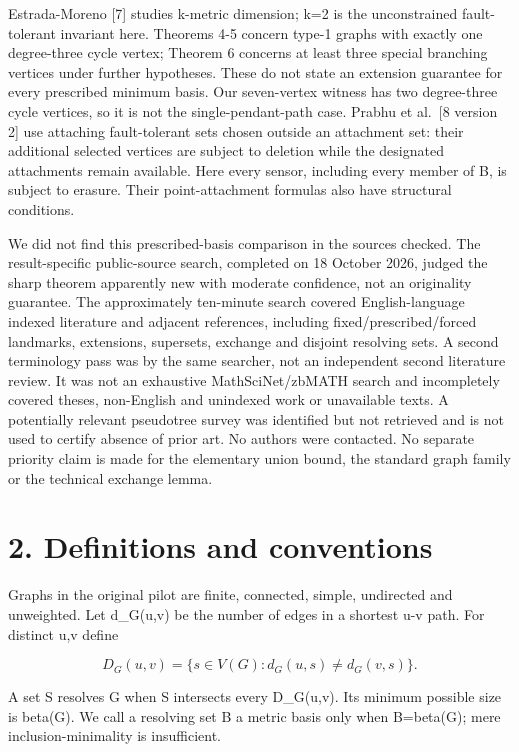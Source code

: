 \documentclass[
]{article}
\begin{document}
Estrada-Moreno {[}7{]} studies k-metric dimension; k=2 is the
unconstrained fault-tolerant invariant here. Theorems 4-5 concern type-1
graphs with exactly one degree-three cycle vertex; Theorem 6 concerns at
least three special branching vertices under further hypotheses. These
do not state an extension guarantee for every prescribed minimum basis.
Our seven-vertex witness has two degree-three cycle vertices, so it is
not the single-pendant-path case. Prabhu et al.~{[}8 version 2{]} use
attaching fault-tolerant sets chosen outside an attachment set: their
additional selected vertices are subject to deletion while the
designated attachments remain available. Here every sensor, including
every member of B, is subject to erasure. Their point-attachment
formulas also have structural conditions.

We did not find this prescribed-basis comparison in the sources checked.
The result-specific public-source search, completed on 18 October 2026,
judged the sharp theorem apparently new with moderate confidence, not an
originality guarantee. The approximately ten-minute search covered
English-language indexed literature and adjacent references, including
fixed/prescribed/forced landmarks, extensions, supersets, exchange and
disjoint resolving sets. A second terminology pass was by the same
searcher, not an independent second literature review. It was not an
exhaustive MathSciNet/zbMATH search and incompletely covered theses,
non-English and unindexed work or unavailable texts. A potentially
relevant pseudotree survey was identified but not retrieved and is not
used to certify absence of prior art. No authors were contacted. No
separate priority claim is made for the elementary union bound, the
standard graph family or the technical exchange lemma.

\section{2. Definitions and
conventions}\label{definitions-and-conventions}

Graphs in the original pilot are finite, connected, simple, undirected
and unweighted. Let d\_G(u,v) be the number of edges in a shortest u-v
path. For distinct u,v define

\[D_G(u,v)=\{s\in V(G):d_G(u,s)\ne d_G(v,s)\}.\]

A set S resolves G when S intersects every D\_G(u,v). Its minimum
possible size is beta(G). We call a resolving set B a metric basis only
when \textbar B\textbar=beta(G); mere inclusion-minimality is
insufficient.
\end{document}

